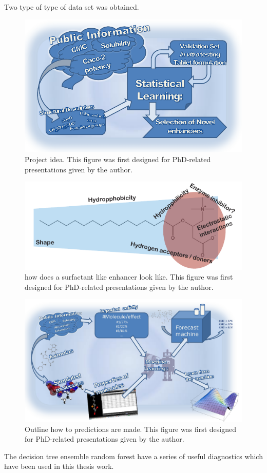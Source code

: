Two type of type of data set was obtained. 

\begin{figure}[ht]
\label{workSummary}
\includegraphics{graphics/workSummary_130mm.pdf}
\caption{Project idea. This figure was first designed for PhD-related presentations given by the author.}
\end{figure}


\begin{figure}[ht]
\label{devel_fassif}
\includegraphics{graphics/typeOfSurfactant.pdf}
\caption{how does a surfactant like enhancer look like. This figure was first designed for PhD-related presentations given by the author.}
\end{figure}

\begin{figure}[ht]
\label{devel_fassif}
\includegraphics[width=\textwidth, height=\textheight, keepaspectratio]{graphics/predictPotencySummary.pdf}
\caption{Outline how to predictions are made. This figure was first designed for PhD-related presentations given by the author.}
\end{figure}

The decision tree ensemble random forest have a series of useful diagnostics which have been used in this thesis work.

\newpage



